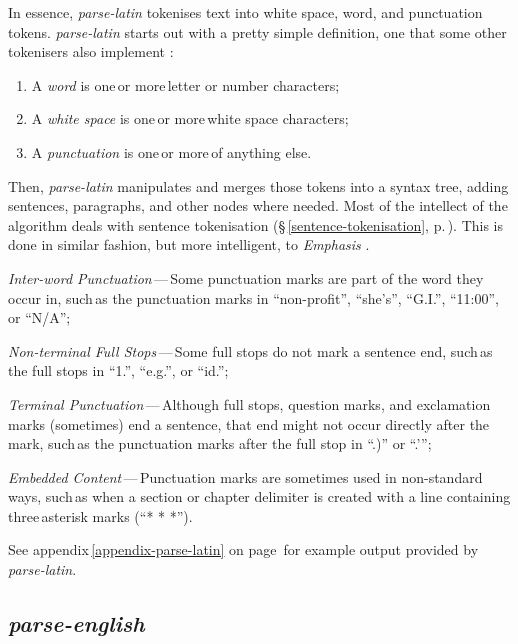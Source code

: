 In essence, \emph{parse-latin} tokenises text into white space, word, and
  punctuation tokens.
\emph{parse-latin} starts out with a pretty simple definition, one that
  some other tokenisers also implement \autocite{treebank-tokenisation}:

\begin{enumerate}
\item A \emph{word} is one\,or more\,letter or number characters;
\item A \emph{white space} is one\,or more\,white space characters;
\item A \emph{punctuation} is one\,or more\,of anything else.
\end{enumerate}

\noindent Then, \emph{parse-latin} manipulates and merges those tokens into a
  syntax tree, adding sentences, paragraphs, and other nodes where needed.
Most of the intellect of the algorithm deals with sentence tokenisation
  (§\,\ref{sentence-tokenisation}, p.\,\pageref{sentence-tokenisation}).
This is done in similar fashion, but more intelligent, to \emph{Emphasis}
  \autocite{nytimes/emphasis-source-code}.

\begin{aenumerate}
\item\emph{Inter-word Punctuation}\,---\,Some punctuation marks are part of
  the word they occur in, such\,as the punctuation marks in ``non-profit'',
  ``she's'', ``G.I.'', ``11:00'', or ``N\slash A'';
\item\emph{Non-terminal Full Stops}\,---\,Some full stops do not mark a
  sentence end, such\,as the full stops in ``1.'', ``e.g.'', or ``id.'';
\item\emph{Terminal Punctuation}\,---\,Although full stops, question marks,
  and exclamation marks (sometimes) end a sentence, that end might not occur
  directly after the mark, such\,as the punctuation marks after the full
  stop in ``.)'' or ``.'{}'';
\item\emph{Embedded Content}\,---\,Punctuation marks are sometimes used in
  non-standard ways, such\,as when a section or chapter delimiter is
  created with a line containing three\,asterisk marks (``* * *'').
\end{aenumerate}

\noindent See appendix\,\ref{appendix-parse-latin} on
page\,\pageref{appendix-parse-latin} for example output provided
by \emph{parse-latin}.

\subsection{\emph{parse-english}}\label{parse-english}

